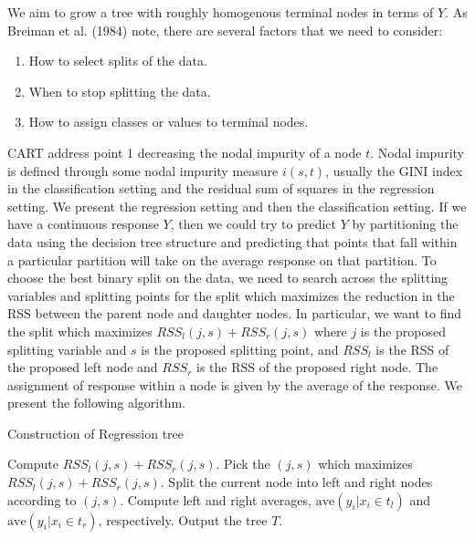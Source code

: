 \documentclass[12pt,twoside]{reedthesis}
\theoremstyle{definition}
\theoremstyle{definition}
\theoremstyle{definition}
\theoremstyle{remark}
\begin{document}
We aim to grow a tree with roughly homogenous terminal nodes in terms of
\(Y\). As Breiman et al. (1984) note, there are several factors that we
need to consider:
\begin{enumerate}
        \item How to select splits of the data.
        
        \item When to stop splitting the data.
        
        \item How to assign classes or values to terminal nodes. 
    \end{enumerate}
CART address point 1 decreasing the nodal impurity of a node \(t\).
Nodal impurity is defined through some nodal impurity measure
\(i(s,t)\), usually the GINI index in the classification setting and the
residual sum of squares in the regression setting. We present the
regression setting and then the classification setting. If we have a
continuous response \(Y\), then we could try to predict \(Y\) by
partitioning the data using the decision tree structure and predicting
that points that fall within a particular partition will take on the
average response on that partition. To choose the best binary split on
the data, we need to search across the splitting variables and splitting
points for the split which maximizes the reduction in the RSS between
the parent node and daughter nodes. In particular, we want to find the
split which maximizes \(RSS_l(j,s)+RSS_r(j,s)\) where \(j\) is the
proposed splitting variable and \(s\) is the proposed splitting point,
and \(RSS_l\) is the RSS of the proposed left node and \(RSS_r\) is the
RSS of the proposed right node. The assignment of response within a node
is given by the average of the response. We present the following
algorithm. \par
\begin{algorithm}
        \caption{Construction of Regression tree}\label{regression tree}
        \begin{algorithmic}[1]
                    \State Compute $RSS_l(j,s)+RSS_r(j,s)$.
                    \EndFor
                    \State Pick the $(j,s)$ which maximizes $RSS_l(j,s)+RSS_r(j,s)$.
                    \State Split the current node into left and right nodes according to $(j,s)$.
                    \State Compute left and right averages, $\text{ave}(y_i|x_i\in t_l)$ and $\text{ave}(y_i|x_i\in t_r)$, respectively. 
                \EndFor
                \State Output the tree $T$.
            \EndWhile
        \end{algorithmic}
    \end{algorithm}
\end{document}

